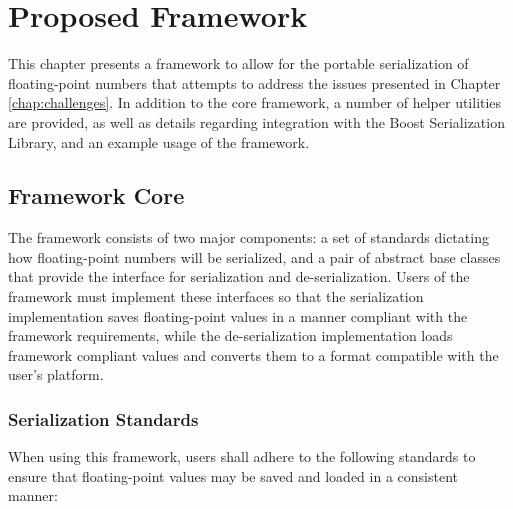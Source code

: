 \chapter{Proposed Framework}
\label{chap:framework}
This chapter presents a framework to allow for the portable serialization of floating-point numbers that attempts to address the issues presented in Chapter \ref{chap:challenges}. In addition to the core framework, a number of helper utilities are provided, as well as details regarding integration with the Boost Serialization Library, and an example usage of the framework.

\section{Framework Core}
\label{sec:framework_core}
The framework consists of two major components: a set of standards dictating how floating-point numbers will be serialized, and a pair of abstract base classes that provide the interface for serialization and de-serialization. Users of the framework must implement these interfaces so that the serialization implementation saves floating-point values in a manner compliant with the framework requirements, while the de-serialization implementation loads framework compliant values and converts them to a format compatible with the user's platform.

\subsection{Serialization Standards}
When using this framework, users shall adhere to the following standards to ensure that floating-point values may be saved and loaded in a consistent manner:

